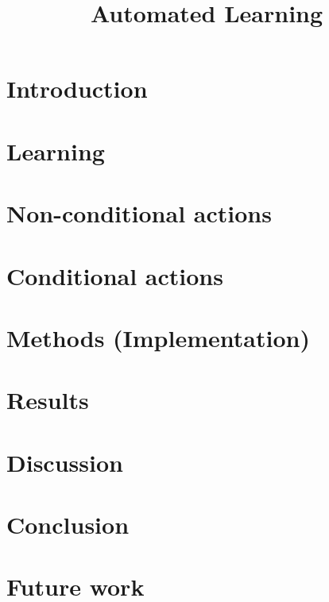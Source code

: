 \documentclass[english]{report}
\title {Automated Learning}
\theoremstyle{plain}
\theoremstyle{definition}
\begin{document}
\graphicspath{{Graphics/}}

\maketitle

\tableofcontents

\chapter{Introduction}
	

\chapter{Learning} \label{sec:Learning}
    

\chapter{Non-conditional actions}
    

\chapter{Conditional actions}
    

\chapter{Methods (Implementation)}

\chapter{Results}

\chapter{Discussion}

\chapter{Conclusion}

\chapter{Future work}

%     
%
%     

{}

\end{document}
